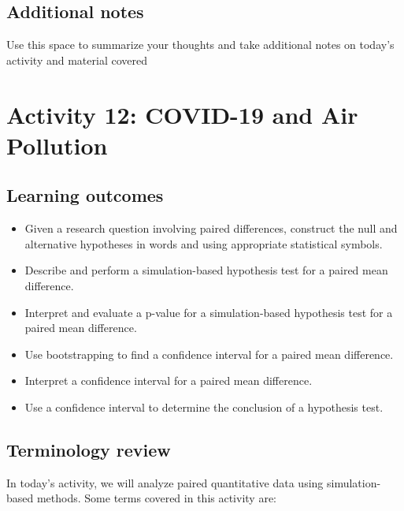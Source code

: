 \documentclass[
]{report}
\begin{document}
\hypertarget{additional-notes-18}{%
\subsection{Additional notes}\label{additional-notes-18}}

Use this space to summarize your thoughts and take additional notes on today's activity and material covered

\newpage

\hypertarget{activity-12-covid-19-and-air-pollution}{%
\section{Activity 12: COVID-19 and Air Pollution}\label{activity-12-covid-19-and-air-pollution}}


\hypertarget{learning-outcomes-23}{%
\subsection{Learning outcomes}\label{learning-outcomes-23}}

\begin{itemize}
\item
  Given a research question involving paired differences, construct the null and alternative hypotheses
  in words and using appropriate statistical symbols.
\item
  Describe and perform a simulation-based hypothesis test for a paired mean difference.
\item
  Interpret and evaluate a p-value for a simulation-based hypothesis test for a paired mean difference.
\item
  Use bootstrapping to find a confidence interval for a paired mean difference.
\item
  Interpret a confidence interval for a paired mean difference.
\item
  Use a confidence interval to determine the conclusion of a hypothesis test.
\end{itemize}

\hypertarget{terminology-review-20}{%
\subsection{Terminology review}\label{terminology-review-20}}

In today's activity, we will analyze paired quantitative data using simulation-based methods. Some terms covered in this activity are:
\end{document}
